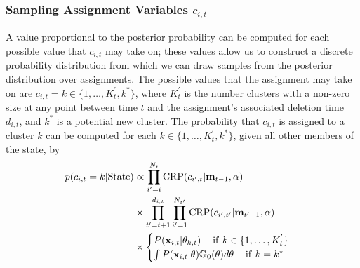 \documentclass[twocolumn, final]{svjour3}
\begin{document}

\subsubsection{Sampling Assignment Variables $c_{i,t}$}
\label{sec:sample_assignments}

A value proportional to the posterior probability can be computed for each possible value that $c_{i,t}$ may take on; these values allow us to construct a discrete probability distribution from which we can draw samples from the posterior distribution over assignments. The possible values that the assignment may take on are $c_{i,t} = k \in \{ 1 , \ldots ,  K_{t}^{'}, k^{*}\}$, where $K_{t}^{'}$ is the number clusters with a non-zero size at any point between time $t$ and the assignment's associated deletion time $d_{i,t}$, and $k^{*}$ is a potential new cluster. The probability that $c_{i,t}$ is assigned to a cluster $k$ can be computed for each $k \in \{ 1 , \ldots ,  K_{t}^{'}, k^{*} \}$, given all other members of the state, by
\begin{equation}
\label{mcmc_assig_vars}
\begin{split}
p(c_{i,t} = k | \text{State}) & \propto
\prod_{i'=i}^{N_{t}}  \text{CRP}(c_{i',t} | \bold{m}_{t-1}, \alpha) \\
& \times \prod_{t' = t+1}^{d_{i,t}}  \prod_{i'=1}^{N_{t'}}   \text{CRP}(c_{i',t'} | \bold{m}_{t'-1}, \alpha) \\
 & \times
\begin{cases}
	P(\bold{x}_{i,t} | \theta_{k,t})                                        \hspace{12pt} \text{if} \hspace{4pt} k \in \{ 1, \ldots, K_{t}^{'} \} \\
	\int P(\bold{x}_{i,t} | \theta) \mathbb{G}_{0}(\theta) d\theta    \hspace{12pt} \text{if}  \hspace{4pt}  k = k^{*}
\end{cases}
\end{split}
\end{equation}
\end{document}
